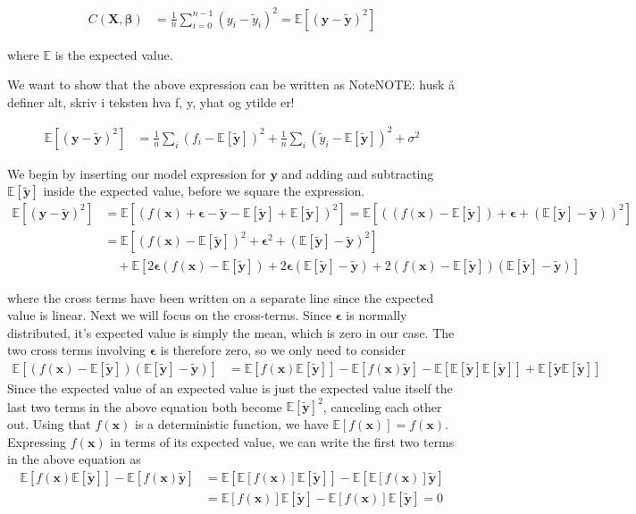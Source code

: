 \documentclass[reprint,english,notitlepage,aps,nobalancelastpage,nofootinbib]{revtex4-1}  %
\newcommand{\expy}{\mathbb{E}[\mathbf{\tilde{y}}]}
\newcommand{\closed}[1]{\left({#1}\right)}
\newcommand{\bracket}[1]{\left[{#1}\right]}
\begin{document}
\begin{align*}
  C(\mathbf{X}, \bm{\beta}) &= \frac{1}{n} \sum_{i=0}^{n-1} (y_i - \tilde{y}_i)^2 = \mathbb{E}\left[(\mathbf{y} - \mathbf{\tilde{y}})^2\right]
\end{align*}


where $\mathbb{E}$ is the expected value. %

We want to show that the above expression can be written as
NoteNOTE: husk å definer alt, skriv i teksten hva f, y, yhat og ytilde er!

\begin{align*}
  \mathbb{E}\left[(\mathbf{y} - \mathbf{\tilde{y}})^2\right] &= \frac{1}{n} \sum_i (f_i - \expy)^2 + \frac{1}{n}\sum_i (\tilde{y}_i - \expy )^2 + \sigma^2
\end{align*}

We begin by inserting our model expression for $\mathbf{y}$ and adding and subtracting $\expy$ inside the expected value, before we square the expression.
\begin{align*}
  \mathbb{E}\bracket{(\mathbf{y} - \mathbf{\tilde{y}})^2} &= \mathbb{E}\bracket{(f(\mathbf{x}) + \bm{\epsilon} - \mathbf{\tilde{y}} - \expy + \expy)^2} = \mathbb{E}\bracket{\closed{(f(\mathbf{x}) - \expy) + \bm{\epsilon} + (\expy - \mathbf{\tilde{y}}) }^2 } \\
  &= \mathbb{E}\bracket{(f(\mathbf{x}) - \expy)^2 + \bm{\epsilon}^2 + (\expy - \mathbf{\tilde{y}})^2} \\
  &\quad+ \mathbb{E}\bracket{2\bm{\epsilon} (f(\mathbf{x}) - \expy) + 2\bm{\epsilon}(\expy - \mathbf{\tilde{y}}) + 2 (f(\mathbf{x}) - \expy)(\expy - \mathbf{\tilde{y}})}
\end{align*}

where the cross terms have been written on a separate line since the expected value is linear. Next we will focus on the cross-terms. Since $\bm{\epsilon}$ is normally distributed, it's expected value is simply the mean, which is zero in our case. The two cross terms involving $\bm{\epsilon}$ is therefore zero, so we only need to consider
\begin{align*}
  \mathbb{E}\bracket{(f(\mathbf{x}) - \expy)(\expy - \mathbf{\tilde{y}})} &= \mathbb{E}\bracket{f(\mathbf{x})\expy} - \mathbb{E}\bracket{f(\mathbf{x})\mathbf{\tilde{y}}} - \mathbb{E}\bracket{\expy\expy} + \mathbb{E}\bracket{\mathbf{\tilde{y}}\expy}
\end{align*}
Since the expected value of an expected value is just the expected value itself the last two terms in the above equation both become $\expy^2$, canceling each other out. Using that $f(\mathbf{x})$ is a deterministic function, we have $\mathbb{E}[f(\mathbf{x})]=f(\mathbf{x})$. Expressing $f(\mathbf{x})$ in terms of its expected value, we can write the first two terms in the above equation as
\begin{align*}
  \mathbb{E}\bracket{f(\mathbf{x})\expy} - \mathbb{E}\bracket{f(\mathbf{x})\mathbf{\tilde{y}}} &= \mathbb{E}\bracket{\mathbb{E}\bracket{f(\mathbf{x})}\expy} - \mathbb{E}\bracket{\mathbb{E}\bracket{f(\mathbf{x})}\mathbf{\tilde{y}}} \\
  &= \mathbb{E}\bracket{f(\mathbf{x})}\expy - \mathbb{E}\bracket{f(\mathbf{x})}\expy = 0
\end{align*}
\end{document}
